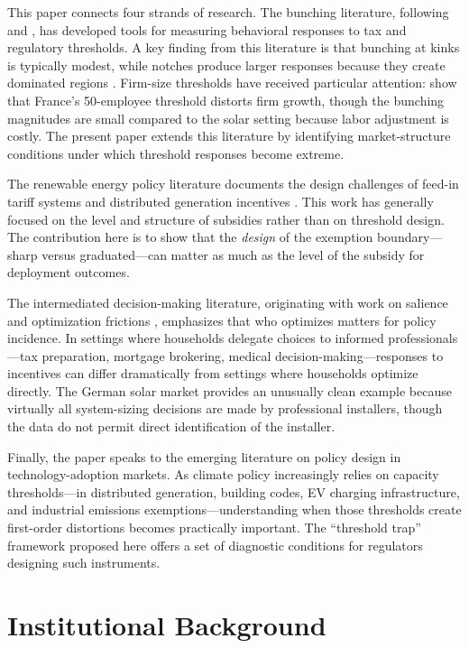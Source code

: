 \documentclass[12pt]{article}
\begin{document}
This paper connects four strands of research. The bunching literature, following \citet{saez2010taxpayers} and \citet{kleven2013using}, has developed tools for measuring behavioral responses to tax and regulatory thresholds. A key finding from this literature is that bunching at kinks is typically modest, while notches produce larger responses because they create dominated regions \citep{kleven2016bunching}. Firm-size thresholds have received particular attention: \citet{garicano2016firm} show that France's 50-employee threshold distorts firm growth, though the bunching magnitudes are small compared to the solar setting because labor adjustment is costly. The present paper extends this literature by identifying market-structure conditions under which threshold responses become extreme.

The renewable energy policy literature documents the design challenges of feed-in tariff systems and distributed generation incentives \citep{borenstein2012private, hughes2015policy}. This work has generally focused on the level and structure of subsidies rather than on threshold design. The contribution here is to show that the \textit{design} of the exemption boundary---sharp versus graduated---can matter as much as the level of the subsidy for deployment outcomes.

The intermediated decision-making literature, originating with work on salience and optimization frictions \citep{chetty2009salience, chetty2011adjustment}, emphasizes that who optimizes matters for policy incidence. In settings where households delegate choices to informed professionals---tax preparation, mortgage brokering, medical decision-making---responses to incentives can differ dramatically from settings where households optimize directly. The German solar market provides an unusually clean example because virtually all system-sizing decisions are made by professional installers, though the data do not permit direct identification of the installer.

Finally, the paper speaks to the emerging literature on policy design in technology-adoption markets. As climate policy increasingly relies on capacity thresholds---in distributed generation, building codes, EV charging infrastructure, and industrial emissions exemptions---understanding when those thresholds create first-order distortions becomes practically important. The ``threshold trap'' framework proposed here offers a set of diagnostic conditions for regulators designing such instruments.


\section{Institutional Background}
\label{sec:background}
\end{document}
